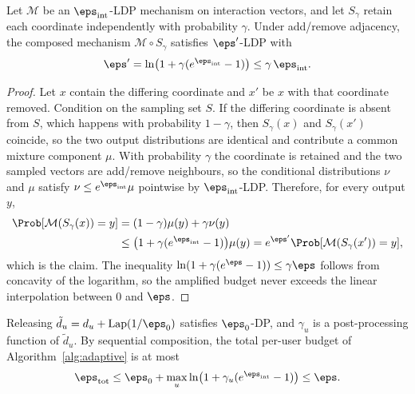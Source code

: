\begin{lemma}\label{lem:amplification}
Let $\mathcal{M}$ be an $\eps_{\text{int}}$-LDP mechanism on interaction vectors, and let $S_\gamma$ retain each coordinate independently with probability $\gamma$. Under add/remove adjacency, the composed mechanism $\mathcal{M}\circ S_\gamma$ satisfies $\eps'$-LDP with
\begin{equation}\label{eq:amplification}
\eps'=\ln\!\big(1+\gamma(e^{\eps_{\text{int}}}-1)\big)\le\gamma\,\eps_{\text{int}}.
\end{equation}
\end{lemma}

\begin{proof}
Let $x$ contain the differing coordinate and $x'$ be $x$ with that coordinate removed. Condition on the sampling set $S$. If the differing coordinate is absent from $S$, which happens with probability $1-\gamma$, then $S_\gamma(x)$ and $S_\gamma(x')$ coincide, so the two output distributions are identical and contribute a common mixture component $\mu$. With probability $\gamma$ the coordinate is retained and the two sampled vectors are add/remove neighbours, so the conditional distributions $\nu$ and $\mu$ satisfy $\nu\le e^{\eps_{\text{int}}}\mu$ pointwise by $\eps_{\text{int}}$-LDP. Therefore, for every output $y$,
\begin{equation}
\begin{aligned}
\Prob[\mathcal{M}(S_\gamma(x))=y]&=(1-\gamma)\mu(y)+\gamma\nu(y)\\
&\le\big(1+\gamma(e^{\eps_{\text{int}}}-1)\big)\mu(y)
=e^{\eps'}\Prob[\mathcal{M}(S_\gamma(x'))=y],
\end{aligned}
\end{equation}
which is the claim. The inequality $\ln(1+\gamma(e^{\eps}-1))\le\gamma\eps$ follows from concavity of the logarithm, so the amplified budget never exceeds the linear interpolation between $0$ and $\eps$.
\end{proof}

\begin{corollary}\label{cor:budget}
Releasing $\tilde d_u=d_u+\mathrm{Lap}(1/\eps_0)$ satisfies $\eps_0$-DP, and $\gamma_u$ is a post-processing function of $\tilde d_u$. By sequential composition, the total per-user budget of Algorithm~\ref{alg:adaptive} is at most
\begin{equation}\label{eq:totalbudget}
\eps_{\text{tot}}\le\eps_0+\max_{u}\ln\!\big(1+\gamma_u(e^{\eps_{\text{int}}}-1)\big)\le\eps .
\end{equation}
\end{corollary}

